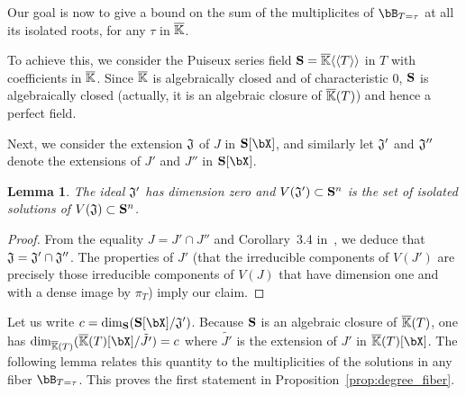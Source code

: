 \documentclass[12pt]{article}
\newtheorem{lemma}[definition]{Lemma}
\begin{document}
Our goal is now to give a bound on the sum of the multiplicites of
$\bB_{T=\tau}$ at all its isolated roots, for any $\tau$ in $\overline{\mathbb{K}}$.

To achieve this, we consider the Puiseux series field
$\mathbf{S} = \overline{\mathbb{K}}\langle \langle T\rangle \rangle$ in $T$ with
coefficients in $\overline{\mathbb{K}}$.  Since $\overline{\mathbb{K}}$ is algebraically closed and
of characteristic $0$, $\mathbf{S}$ is algebraically closed (actually, it is
an algebraic closure of $\overline{\mathbb{K}}(T)$) and hence a perfect field.

Next, we consider the extension $\frak{J}$ of $J$ in $\SS[\bX]$, and
similarly let $\frak{J}'$ and ${\frak J}''$ denote the extensions of $J'$ and
$J''$ in $\SS[\bX]$.

\begin{lemma}\label{lemma:dimJprime}
  The ideal $\frak{J}'$ has dimension zero and $V(\frak{J}') \subset
  \mathbf{S}^n$ is the set of isolated solutions of
  $V(\frak{J}) \subset \mathbf{S}^n$.
\end{lemma}
\begin{proof}
 From the equality $J=J' \cap J''$ and Corollary~3.4 in~\cite{AtMc},
 we deduce that $\frak{J}=\frak{J'} \cap \frak{J''}$. The properties
 of $J'$ (that the irreducible components of $V(J')$ are precisely those
 irreducible components of $V(J)$ that have dimension one and with a
 dense image by $\pi_T$) imply our claim.
\end{proof}


Let us write $c=\dim_{\SS}(\SS[\bX]/{\frak J}')$. Because $\mathbf{S}$ is an
algebraic closure of $\overline{\mathbb{K}}(T)$, one has $\dim_{\KKbar(T)} (
\KKbar(T)[\bX]/\tilde{J'} ) = c$ where $\tilde{J'}$ is the extension
of $J'$ in $\KKbar(T)[\bX]$. The following lemma relates this
quantity to the multiplicities of the solutions in any fiber
$\bB_{T=\tau}$. This proves the first statement in
Proposition~\ref{prop:degree_fiber}.
\end{document}
